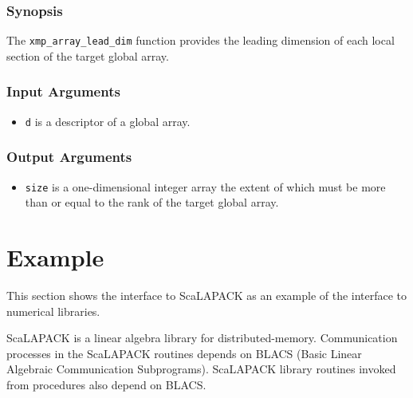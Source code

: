 \subsubsection*{Synopsis}

The {\tt xmp\_array\_lead\_dim} function provides the leading dimension
of each local section of the target global array.

\subsubsection*{Input Arguments}
\begin{itemize}
 \item {\tt d} is a descriptor of a global array.
\end{itemize}

\subsubsection*{Output Arguments}
\begin{itemize}
 \item {\tt size} is a one-dimensional integer array the extent of which
       must be more than or equal to the rank of the target global array.
\end{itemize}


\section{Example}

   This section shows the interface to ScaLAPACK as an example of the
   {\XMP} interface to numerical libraries.
   
   ScaLAPACK is a linear algebra library for distributed-memory.
   Communication processes in the ScaLAPACK routines depends on BLACS
   (Basic Linear Algebraic Communication Subprograms).
   ScaLAPACK library routines invoked from {\XMP} procedures also depend
   on BLACS. %


